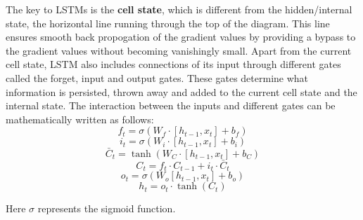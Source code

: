 \documentclass[letterpaper, 12 pt, conference]{ieeeconf}  %
\begin{document}
The key to LSTMs is the \textbf{cell state}, which is different from the hidden/internal state, the horizontal line running through the top of the diagram. This line ensures smooth back propogation of the gradient values by providing a bypass to the gradient values without becoming vanishingly small. Apart from the current cell state, LSTM also includes connections of its input through different gates called the forget, input and output gates. These gates determine what information is persisted, thrown away and added to the current cell state and the internal state. The interaction between the inputs and different gates can be mathematically written as follows:
\begin{equation}
f_{t} = \sigma(W_f\cdot[h_{t-1}, x_t] + b_f)
\end{equation}
\begin{equation}
i_{t} = \sigma(W_i\cdot[h_{t-1}, x_t] + b_i)
\end{equation}
\begin{equation}
\bar{C}_t = \tanh(W_C\cdot[h_{t-1}, x_t] + b_C)
\end{equation}
\begin{equation}
C_t = f_t \cdot C_{t-1} + i_t \cdot \bar{C}_t
\end{equation}
\begin{equation}
o_t = \sigma(W_o[h_{t-1}, x_t] + b_o)
\end{equation}
\begin{equation}
h_t = o_t \cdot \tanh(C_t)
\end{equation}

Here $\sigma$ represents the sigmoid function. %
\end{document}
